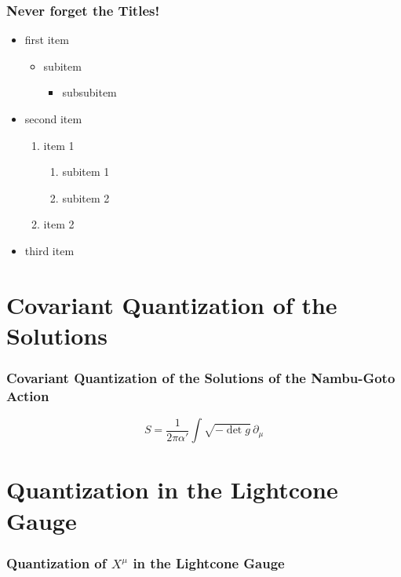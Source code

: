 \documentclass[aspectratio=169]{beamer}
\begin{document}
	\begin{frame}
		\frametitle{Never forget the Titles!}
		\begin{itemize}
			\item<1,2,3,4,5> first item 
			\begin{itemize}
				\item<2,3,4,5> subitem
				\begin{itemize}
					\item<3,4,5> subsubitem
				\end{itemize}
			\end{itemize}
			\item<4,5>second item
			\begin{enumerate}
				\item item 1
				\begin{enumerate}
					\item subitem 1
					\item subitem 2
				\end{enumerate}
				\item item 2
			\end{enumerate}
			\item<5>third item
		\end{itemize}	
	\end{frame}

	\section{Covariant Quantization of the Solutions}
	
	\begin{frame}
		\frametitle{Covariant Quantization of the Solutions of the Nambu-Goto Action}
		
		\begin{equation}
			S = \frac{1}{2\pi\alpha'}\int\sqrt{-\det g} \, \partial_\mu
		\end{equation}
	
	\end{frame}	

	\section{Quantization in the Lightcone Gauge}
	
	\begin{frame}
		\frametitle{Quantization of $X^\mu$ in the Lightcone Gauge}
	\end{frame}
\end{document}
